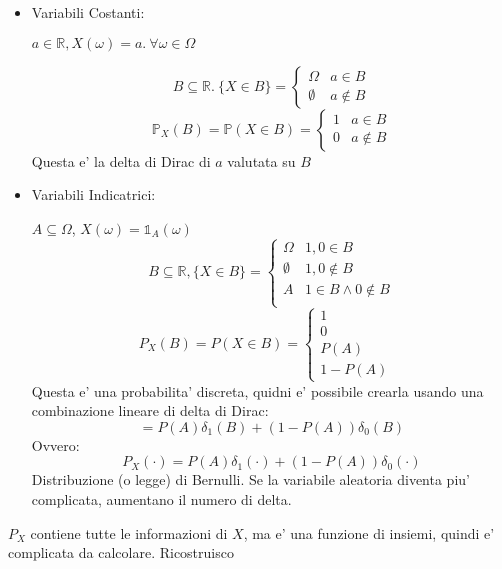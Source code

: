   \begin{itemize}
  \item Variabili Costanti:

    $ a \in \mathbb{R}, X(\omega) = a.\ \forall \omega \in \Omega $

    \[
    B \subseteq \mathbb{R}.\ \{X \in B\} = \begin{cases}
    \Omega & a \in B\\
    \emptyset &  a \notin B
    \end{cases}
    \]
    \[
    \mathbb{P}_X(B) = \mathbb{P}(X \in B) = \begin{cases}
    1 & a \in B\\
    0 & a \notin B
    \end{cases}
    \]
      Questa e' la delta di Dirac di $ a $ valutata su $ B $
    \item Variabili Indicatrici:

      $ A \subseteq \Omega $, $ X(\omega) = \mathbb{1}_A(\omega) $
      \[
      B \subseteq \mathbb{R}, \{X \in B\} = \begin{cases}
      \Omega & 1, 0 \in B\\
      \emptyset & 1, 0 \notin B\\
      A & 1 \in B \land 0 \notin B\\
       & 
      \end{cases}
      \]
      \[
        P_X(B) = P(X \in B) = \begin{cases}
        1 & \\
        0 & \\
          P(A) & \\
          1-P(A) & 
        \end{cases}
      \]
      Questa e' una probabilita' discreta, quidni e' possibile crearla usando una combinazione lineare di delta di Dirac: 
      \[
        = P(A)\delta_1(B) + (1-P(A))\delta_0(B)
      \]
      Ovvero:
      \[
        P_X(\cdot) = P(A)\delta_1(\cdot) + (1-P(A))\delta_0(\cdot)
      \]
      Distribuzione (o legge) di Bernulli. Se la variabile aleatoria diventa piu' complicata, aumentano il numero di delta.
  \end{itemize}

  $ P_X $ contiene tutte le informazioni di $ X $, ma e' una funzione di insiemi, quindi e' complicata da calcolare.
  \dfn{}{
    $ (\Omega, P) $ SP $ X: \Omega \to \mathbb{R} $, si chiama funzione di \textit{ripartizione} di $ X $:
    \[
      F_X: \mathbb{R} \to [0,1]
    \]
    \[
      x \to P_X((-\infty, x])
    \]
  }
  Ricostruisco 

